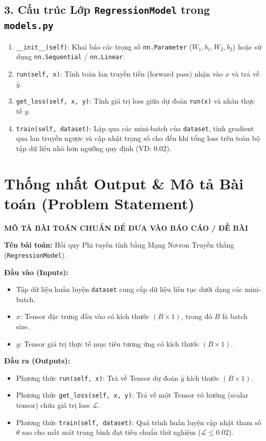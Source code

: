 \documentclass[11pt, a4paper]{article}
\begin{document}
\subsection{3. Cấu trúc Lớp \texttt{RegressionModel} trong \texttt{models.py}}
\begin{enumerate}[itemsep=3pt]
    \item \texttt{\_\_init\_\_(self)}: Khai báo các trọng số \texttt{nn.Parameter} ($W_1, b_1, W_2, b_2$) hoặc sử dụng \texttt{nn.Sequential} / \texttt{nn.Linear}.
    \item \texttt{run(self, x)}: Tính toán lan truyền tiến (forward pass) nhận vào $x$ và trả về $\hat{y}$.
    \item \texttt{get\_loss(self, x, y)}: Tính giá trị loss giữa dự đoán \texttt{run(x)} và nhãn thực tế $y$.
    \item \texttt{train(self, dataset)}: Lặp qua các mini-batch của \texttt{dataset}, tính gradient qua lan truyền ngược và cập nhật trọng số cho đến khi tổng loss trên toàn bộ tập dữ liệu nhỏ hơn ngưỡng quy định (VD: $0.02$).
\end{enumerate}

\section{Thống nhất Output \& Mô tả Bài toán (Problem Statement)}

\begin{mdframed}[style=codeblock]
\textbf{MÔ TẢ BÀI TOÁN CHUẨN ĐỂ ĐƯA VÀO BÁO CÁO / ĐỀ BÀI}

\textbf{Tên bài toán:} Hồi quy Phi tuyến tính bằng Mạng Nơ-ron Truyền thẳng (\texttt{RegressionModel}).

\textbf{Đầu vào (Inputs):}
\begin{itemize}[itemsep=2pt]
    \item Tập dữ liệu huấn luyện \texttt{dataset} cung cấp dữ liệu liên tục dưới dạng các mini-batch.
    \item $x$: Tensor đặc trưng đầu vào có kích thước $(B \times 1)$, trong đó $B$ là batch size.
    \item $y$: Tensor giá trị thực tế mục tiêu tương ứng có kích thước $(B \times 1)$.
\end{itemize}

\textbf{Đầu ra (Outputs):}
\begin{itemize}[itemsep=2pt]
    \item Phương thức \texttt{run(self, x)}: Trả về Tensor dự đoán $\hat{y}$ kích thước $(B \times 1)$.
    \item Phương thức \texttt{get\_loss(self, x, y)}: Trả về một Tensor vô hướng (scalar tensor) chứa giá trị loss $\mathcal{L}$.
    \item Phương thức \texttt{train(self, dataset)}: Quá trình huấn luyện cập nhật tham số $\theta$ sao cho mất mát trung bình đạt tiêu chuẩn thử nghiệm ($\mathcal{L} \le 0.02$).
\end{itemize}
\end{mdframed}
\end{document}

